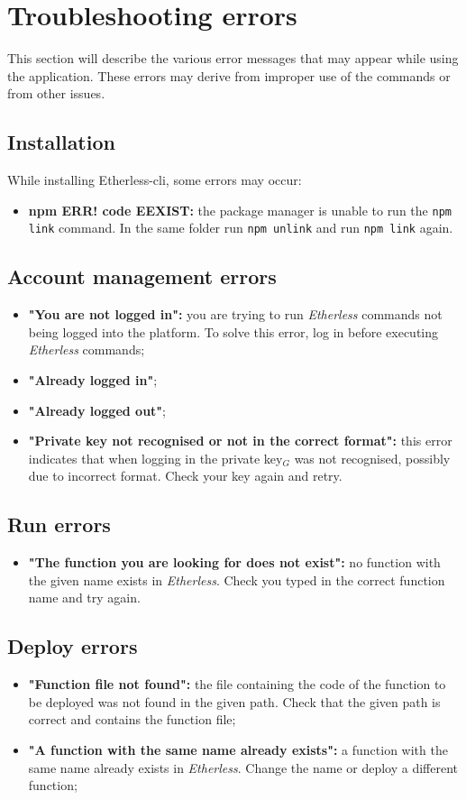 \section{Troubleshooting errors}
  This section will describe the various error messages that may appear while using the application. These errors may derive from improper use of the commands or from other issues.
  \subsection{Installation}
    While installing Etherless-cli, some errors may occur:
    \begin{itemize}
      \item \textbf{npm ERR! code EEXIST:} the package manager is unable to run the \texttt{npm link} command. In the same folder run \texttt{npm unlink} and run \texttt{npm link} again.
    \end{itemize}
  \subsection{Account management errors}
    \begin{itemize}
      \item \textbf{"You are not logged in":} you are trying to run \textit{Etherless} commands not being logged into the platform. To solve this error, log in before executing \textit{Etherless} commands;
      \item \textbf{"Already logged in"};
      \item \textbf{"Already logged out"};
      \item \textbf{"Private key not recognised or not in the correct format":} this error indicates that when logging in the private key$_{G}$ was not recognised, possibly due to incorrect format. Check your key again and retry.
    \end{itemize}
  \subsection{Run errors}
  \begin{itemize}
    \item \textbf{"The function you are looking for does not exist":} no function with the given name exists in \textit{Etherless}. Check you typed in the correct function name and try again.
  \end{itemize}
  \subsection{Deploy errors}
  \begin{itemize}
    \item \textbf{"Function file not found":} the file containing the code of the function to be deployed was not found in the given path. Check that the given path is correct and contains the function file;
    \item \textbf{"A function with the same name already exists":} a function with the same name already exists in \textit{Etherless}. Change the name or deploy a different function;
  \end{itemize}
